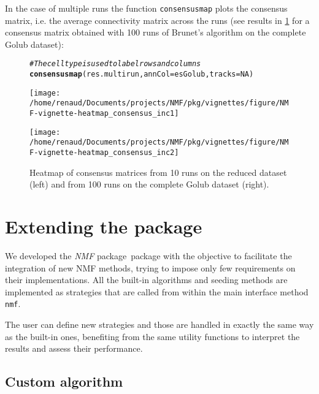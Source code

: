 \documentclass[a4paper]{article}\usepackage[]{graphicx}\usepackage[]{color}
\makeatletter
\newcommand{\hlnum}[1]{\textcolor[rgb]{0.686,0.059,0.569}{#1}}%
\newcommand{\hlcom}[1]{\textcolor[rgb]{0.678,0.584,0.686}{\textit{#1}}}%
\newcommand{\hlstd}[1]{\textcolor[rgb]{0.345,0.345,0.345}{#1}}%
\newcommand{\hlkwc}[1]{\textcolor[rgb]{0.333,0.667,0.333}{#1}}%
\newcommand{\hlkwd}[1]{\textcolor[rgb]{0.737,0.353,0.396}{\textbf{#1}}}%
\newenvironment{kframe}{%
 \def\at@end@of@kframe{}%
 \ifinner\ifhmode%
  \def\at@end@of@kframe{\end{minipage}}%
  \begin{minipage}{\columnwidth}%
 \fi\fi%
 \def\FrameCommand##1{\hskip\@totalleftmargin \hskip-\fboxsep
 \colorbox{shadecolor}{##1}\hskip-\fboxsep
     \hskip-\linewidth \hskip-\@totalleftmargin \hskip\columnwidth}%
 \MakeFramed {\advance\hsize-\width
   \@totalleftmargin\z@ \linewidth\hsize
   \@setminipage}}%
 {\par\unskip\endMakeFramed%
 \at@end@of@kframe}
\newenvironment{knitrout}{}{} %
\let\code=\texttt
\newcommand{\pkgname}[1]{\textit{#1}\xspace}
\newcommand{\Rpkg}[1]{\pkgname{#1} package\xspace}
\newcommand{\nmfpack}{\Rpkg{NMF}}
\makeatother
\begin{document}
In the case of multiple runs the function \code{consensusmap} plots the consensus matrix, i.e. the average connectivity matrix across the runs (see results in \cref{fig:heatmap_consensus} for a consensus matrix obtained with 100 runs of Brunet's algorithm on the complete 
Golub dataset):

\begin{figure}[ht]
\begin{knitrout}
\color{fgcolor}\begin{kframe}
\begin{alltt}
\hlcom{# The cell type is used to label rows and columns}
\hlkwd{consensusmap}\hlstd{(res.multirun,} \hlkwc{annCol} \hlstd{= esGolub,} \hlkwc{tracks} \hlstd{=} \hlnum{NA}\hlstd{)}
\end{alltt}
\end{kframe}
\texttt{[image: /home/renaud/Documents/projects/NMF/pkg/vignettes/figure/NMF-vignette-heatmap\_consensus\_inc1]} 

\texttt{[image: /home/renaud/Documents/projects/NMF/pkg/vignettes/figure/NMF-vignette-heatmap\_consensus\_inc2]} 

\end{knitrout}



\caption{Heatmap of consensus matrices from 10 runs on the reduced dataset
(left) and from 100 runs on the complete Golub dataset (right).}
\label{fig:heatmap_consensus}
\end{figure}
 
\section{Extending the package}

We developed the \nmfpack\ package with the objective to facilitate the integration of new NMF methods, trying to impose only few requirements on their implementations. 
All the built-in algorithms and seeding methods are implemented as strategies that are called from within the main interface method \code{nmf}. 

The user can define new strategies and those are handled in exactly the same way as the built-in ones, benefiting from the same utility functions to interpret the 
results and assess their performance. 

\subsection{Custom algorithm}
%
%
\end{document}

